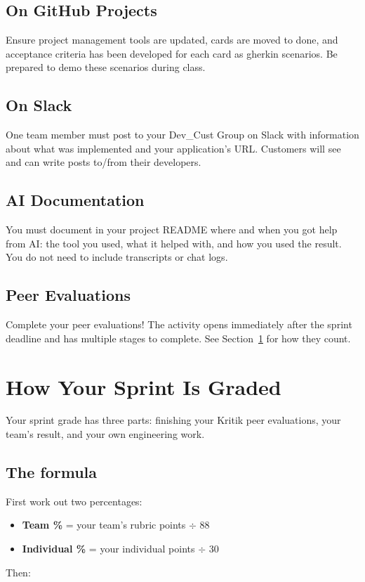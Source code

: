 \documentclass[11pt]{article}
\begin{document}
\subsection*{On GitHub Projects}
Ensure project management tools are updated, cards are moved to done, and acceptance criteria has been developed for each card as gherkin scenarios. Be prepared to demo these scenarios during class. 

\subsection*{On Slack}
One team member must post to your Dev\_Cust Group on Slack with information about what was implemented and your application's URL. Customers will see and can write posts to/from their developers.

\subsection*{AI Documentation}
You must document in your project README where and when you got help from AI: the tool you used, what it helped with, and how you used the result. You do not need to include transcripts or chat logs.

\subsection*{Peer Evaluations}
Complete your peer evaluations! The activity opens immediately after the sprint deadline and has multiple stages to complete. See Section~\ref{sec:grading} for how they count.

\newpage
\section{How Your Sprint Is Graded}\label{sec:grading}

Your sprint grade has three parts: finishing your Kritik peer evaluations, your team's result, and your own engineering work.

\subsection*{The formula}
First work out two percentages:
\begin{itemize}
    \item \textbf{Team \%} = your team's rubric points $\div$ 88
    \item \textbf{Individual \%} = your individual points $\div$ 30
\end{itemize}
Then:
\begin{center}
\end{center}
\end{document}
